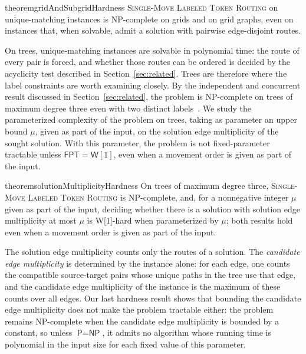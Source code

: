 \documentclass[a4paper,USenglish,thm-restate]{lipics-v2021}
\theoremstyle{problemstyle}
\begin{document}
\begin{restatable}{theorem}{gridAndSubgridHardness}
\label{thm:grid_and_subgrid_hardness}
\textsc{Single-Move Labeled Token Routing} on unique-matching instances is
\textsf{NP}-complete on grids and on grid graphs, even on instances that,
when solvable, admit a solution with pairwise edge-disjoint routes.
\end{restatable}

On trees, unique-matching instances are solvable in polynomial time: the
route of every pair is forced, and whether those routes can be ordered is
decided by the acyclicity test described in Section~\ref{sec:related}. Trees are therefore where
the label constraints are worth examining closely. By the independent and
concurrent result discussed in Section~\ref{sec:related}, the problem is
\textsf{NP}-complete on trees of maximum degree three even with two
distinct labels~\cite{Geft2026Trees}. We study the parameterized complexity
of the problem on trees, taking as parameter an upper bound $\mu$, given as
part of the input, on the solution edge multiplicity of the sought solution.
With this parameter, the problem is not fixed-parameter tractable unless
$\textsf{FPT}=\textsf{W}[1]$, even when a movement order is given as part of
the input.


\begin{restatable}{theorem}{solutionMultiplicityHardness}
\label{thm:sol_multiplicity_hardness}
On trees of maximum degree three, \textsc{Single-Move Labeled Token Routing}
is \textsf{NP}-complete, and, for a nonnegative integer $\mu$ given as part
of the input, deciding whether there is a solution with solution edge
multiplicity at most $\mu$ is \textsf{W}[1]-hard when parameterized by
$\mu$; both results hold even when a movement order is given as part of
the input.
\end{restatable}


The solution edge multiplicity counts only the routes of a solution.
The \emph{candidate edge multiplicity} is determined by the instance alone:
for each edge, one counts the compatible source-target pairs whose unique
paths in the tree use that edge, and the candidate edge multiplicity of the
instance is the maximum of these counts over all edges. Our last hardness
result shows that bounding the candidate edge multiplicity does not make the
problem tractable either: the problem remains \textsf{NP}-complete when the
candidate edge multiplicity is bounded by a constant, so unless
$\textsf{P}=\textsf{NP}$, it admits no algorithm whose running time is
polynomial in the input size for each fixed value of this parameter.
\end{document}

